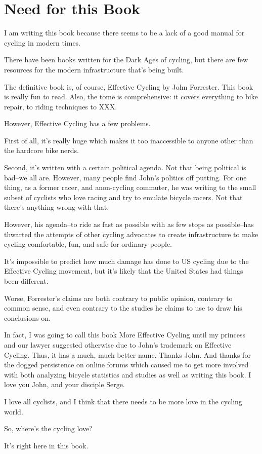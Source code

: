 \chapter{Need for this Book}

I am writing this book because there seems to be a lack of a good manual for cycling in 
modern times.

There have been books written for the Dark Ages of cycling, but there are few
resources for the modern infrastructure that's being built. 

The definitive book is, of course, Effective Cycling by John Forrester. This
book is really fun to read. Also, the tome is comprehensive: it covers everything to bike repair, to riding techniques to XXX.

However, Effective Cycling has a few problems.

First of all, it's really huge which makes it too inaccessible to anyone other than the hardcore bike nerds.

Second, it's  written with a certain political agenda. Not that being political is bad--we all are. However, many people find John's politics off putting. For one thing, as a former racer, and anon-cycling commuter, he was writing to the small subset of cyclists who love racing and try to emulate bicycle racers. Not that there's anything wrong with that.

However, his agenda--to ride as fast as possible with as few stops as possible--has thwarted the attempts of other cycling advocates to create infrastructure to make cycling comfortable, fun, and safe for ordinary people.

It's impossible to predict how much damage has done to US cycling due to the Effective Cycling movement, but it's likely that the United States had things been different.

Worse, Forrester's claims are both contrary to public opinion, contrary to common sense, and even contrary to the studies he claims to use to draw his conclusions on.

In fact, I was going to call this book More Effective Cycling until my princess and our lawyer suggested otherwise due to John's trademark on Effective Cycling. Thus, it has a much, much better name. Thanks John. And thanks for the dogged persistence on online forums which caused me to get more involved with both analyzing bicycle statistics and studies as well as writing this book. I love you John, and your disciple Serge.

I love all cyclists, and I think that there needs to be more love in the cycling world.

So, where's the cycling love?

It's right here in this book. 

